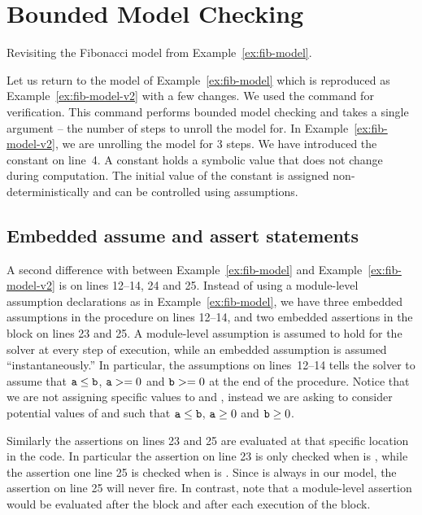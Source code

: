 \section{Bounded Model Checking}

\begin{uclidlisting}[htbp]
    
    \caption{Revisiting the Fibonacci model from Example~\ref{ex:fib-model}.}
    \label{ex:fib-model-v2}
\end{uclidlisting}

Let us return to the model of Example~\ref{ex:fib-model} which is reproduced as Example~\ref{ex:fib-model-v2} with a few changes. We used the  command for verification. This command performs bounded model checking and takes a single argument -- the number of steps to unroll the model for. In Example~\ref{ex:fib-model-v2}, we are unrolling the model for 3 steps. We have introduced the constant  on line~4. A constant holds a symbolic value that does not change during computation. The initial value of the constant is assigned non-deterministically and can be controlled using assumptions.

\subsection{Embedded assume and assert statements}

A second difference with between Example~\ref{ex:fib-model} and Example~\ref{ex:fib-model-v2} is on lines 12--14, 24 and 25.  Instead of using a module-level assumption declarations as in Example~\ref{ex:fib-model}, we have three embedded assumptions in the  procedure on lines 12--14, and two embedded assertions in the  block on lines 23 and 25. A module-level assumption is assumed to hold for the solver at every step of execution, while an embedded assumption is assumed ``instantaneously.'' In particular, the assumptions on lines~12--14 tells the solver to assume that $\texttt{a} \leq \texttt{b}$, $\texttt{a} >= 0$ and $\texttt{b} >= 0$ at the end of the  procedure. Notice that we are not assigning specific values to  and , instead we are asking \uclid{} to consider potential values of  and  such that $\texttt{a} \leq \texttt{b}$, $\texttt{a} \geq 0$ and $\texttt{b} \geq 0$.

Similarly the assertions on lines 23 and 25 are evaluated at that specific location in the code. In particular the assertion on line 23 is only checked when  is , while the assertion one line 25 is checked when  is . Since  is always  in our model, the assertion on line 25 will never fire. In contrast, note that a module-level assertion would be evaluated after the  block and after each execution of the  block.

